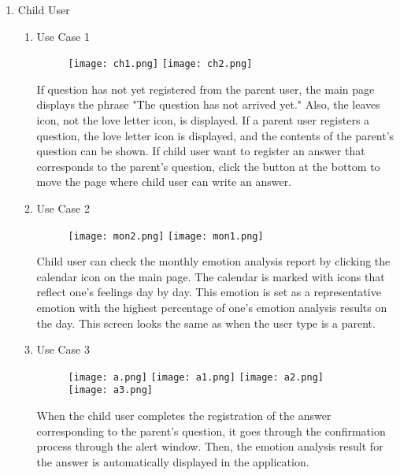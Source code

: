 \documentclass[conference]{IEEEtran}
\begin{document}
\begin{enumerate}
    
    \item Child User
    \begin{enumerate}
        \item Use Case 1
        \begin{figure}[H]
        \centering
        \texttt{[image: ch1.png]}
        \texttt{[image: ch2.png]}
        \end{figure}
        If question has not yet registered from the parent user, the main page displays the phrase "The question has not arrived yet." Also, the leaves icon, not the love letter icon, is displayed. If a parent user registers a question, the love letter icon is displayed, and the contents of the parent's question can be shown. If child user want to register an answer that corresponds to the parent’s question, click the button at the bottom to move the page where child user can write an answer.
        \newpage
        \item Use Case 2
        \begin{figure}[H]
         \centering
         \texttt{[image: mon2.png]}
         \texttt{[image: mon1.png]}
         \end{figure}
        Child user can check the monthly emotion analysis report by clicking the calendar icon on the main page. The calendar is marked with icons that reflect one's feelings day by day. This emotion is set as a representative emotion with the highest percentage of one's emotion analysis results on the day. This screen looks the same as when the user type is a parent.
        \newpage
        \item Use Case 3
        \begin{figure}[H]
        \centering
        \texttt{[image: a.png]}
        \texttt{[image: a1.png]}
        \texttt{[image: a2.png]}
        \texttt{[image: a3.png]}
        \end{figure}
        When the child user completes the registration of the answer corresponding to the parent's question, it goes through the confirmation process through the alert window. Then, the emotion analysis result for the answer is automatically displayed in the application.
    \end{enumerate}
\end{enumerate}
\newpage
\end{document}
